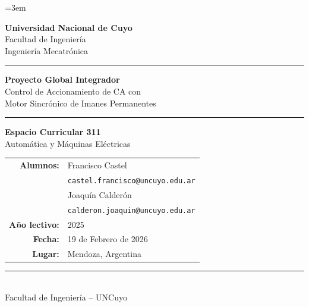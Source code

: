 \documentclass[12pt, a4paper,journal, onecolumn, compsoc]{IEEEtran}
\begin{document}
\setlength{\abovedisplayskip}{12pt plus 3pt minus 3pt}      %
\setlength{\belowdisplayskip}{12pt plus 3pt minus 3pt}      %
\setlength{\abovedisplayshortskip}{10pt plus 3pt minus 3pt} %
\setlength{\belowdisplayshortskip}{10pt plus 3pt minus 3pt} %
\hfuzz=10pt
\emergencystretch=3em

\begin{titlepage}
\thispagestyle{empty}
\centering

\vspace*{1cm}

{\large \textbf{Universidad Nacional de Cuyo}}\\[4pt]
{\large Facultad de Ingeniería}\\[4pt]
{\normalsize Ingeniería Mecatrónica}

\vspace{0.8cm}
\rule{\textwidth}{1.5pt}

\vspace{1.2cm}

{\huge \textbf{Proyecto Global Integrador}}\\[12pt]
{\LARGE Control de Accionamiento de CA con\\Motor Sincrónico de Imanes Permanentes}

\vspace{1.2cm}
\rule{\textwidth}{1.5pt}

\vspace{1.5cm}

{\large \textbf{Espacio Curricular 311}}\\[6pt]
{\Large Automática y Máquinas Eléctricas}

\vspace{2cm}

\begin{tabular}{r l}
    \textbf{Alumnos:} & Francisco Castel \\
                      & \texttt{castel.francisco@uncuyo.edu.ar} \\[8pt]
                      & Joaquín Calderón \\
                      & \texttt{calderon.joaquin@uncuyo.edu.ar} \\[12pt]
    \textbf{Año lectivo:} & 2025 \\[8pt]
    \textbf{Fecha:} & 19 de Febrero de 2026 \\[8pt]
    \textbf{Lugar:} & Mendoza, Argentina \\
\end{tabular}

\vfill

\rule{0.6\textwidth}{0.4pt}\\[6pt]
{\small Facultad de Ingeniería -- UNCuyo}

\end{titlepage}
\end{document}
